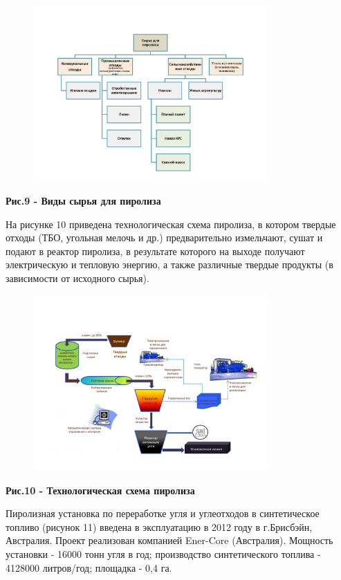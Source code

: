 \begin{figure}[H]
	\centering
	\includegraphics[width=0.8\textwidth]{media/chem2/image72}
	\caption*{}
\end{figure}


{\bfseries Рис.9 - Виды сырья для пиролиза}

На рисунке 10 приведена технологическая схема пиролиза, в котором
твердые отходы (ТБО, угольная мелочь и др.) предварительно измельчают,
сушат и подают в реактор пиролиза, в результате которого на выходе
получают электрическую и тепловую энергию, а также различные твердые
продукты (в зависимости от исходного сырья).


\begin{figure}[H]
	\centering
	\includegraphics[width=0.8\textwidth]{media/chem2/image73}
	\caption*{}
\end{figure}


{\bfseries Рис.10 - Технологическая схема пиролиза}

Пиролизная установка по переработке угля и углеотходов в синтетическое
топливо (рисунок 11) введена в эксплуатацию в 2012 году в г.Брисбэйн,
Австралия. Проект реализован компанией Ener-Core (Австралия). Мощность
установки - 16000 тонн угля в год; производство синтетического топлива -
4128000 литров/год; площадка - 0,4 га.


